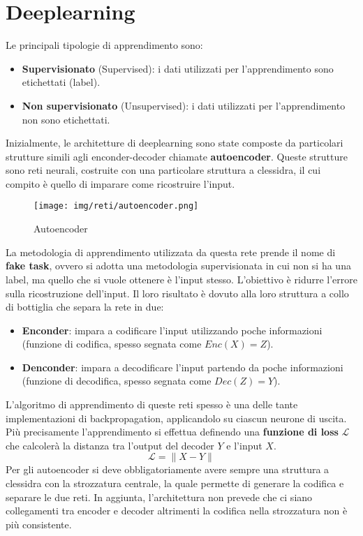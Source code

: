 \chapter{Deeplearning}
Le principali tipologie di apprendimento sono:
\begin{itemize}
      \item \textbf{Supervisionato} (Supervised): i dati utilizzati per
            l'apprendimento sono etichettati (label).
      \item \textbf{Non supervisionato} (Unsupervised): i dati utilizzati per
            l'apprendimento non sono etichettati.
\end{itemize}
Inizialmente, le architetture di deeplearning sono state composte da particolari
strutture simili agli enconder-decoder chiamate \textbf{autoencoder}. Queste
strutture sono reti neurali, costruite con una particolare struttura a clessidra,
il cui compito è quello di imparare come ricostruire l'input.
\begin{figure}[!ht]
      \centering
      \texttt{[image: img/reti/autoencoder.png]}
      \caption{Autoencoder}
      \label{fig:autoencoder}
\end{figure}
La metodologia di apprendimento utilizzata da questa rete prende il nome di
\textbf{fake task}, ovvero si adotta una metodologia supervisionata in cui non si
ha una label, ma quello che si vuole ottenere è l'input stesso. L'obiettivo
è ridurre l'errore sulla ricostruzione dell'input. Il loro risultato è dovuto
alla loro struttura a collo di bottiglia che separa la rete in due:
\begin{itemize}
      \item \textbf{Enconder}: impara a codificare l'input utilizzando poche
            informazioni (funzione di codifica, spesso segnata come $Enc(X) = Z$).
      \item \textbf{Denconder}: impara a decodificare l'input partendo da poche
            informazioni (funzione di decodifica, spesso segnata come $Dec(Z) = Y$).
\end{itemize}
L'algoritmo di apprendimento di queste reti spesso è una delle tante implementazioni
di backpropagation, applicandolo su ciascun neurone di uscita. Più precisamente
l'apprendimento si effettua definendo una \textbf{funzione di loss} $\mathcal{L}$
che calcolerà la distanza tra l'output del decoder $Y$ e l'input $X$.
\begin{equation}
      \mathcal{L} = \| X - Y \|
\end{equation}
Per gli autoencoder si deve obbligatoriamente avere sempre una struttura a clessidra
con la strozzatura centrale, la quale permette di generare la codifica e separare
le due reti. In aggiunta, l'architettura non prevede che ci siano collegamenti
tra encoder e decoder altrimenti la codifica nella strozzatura non è più consistente.

